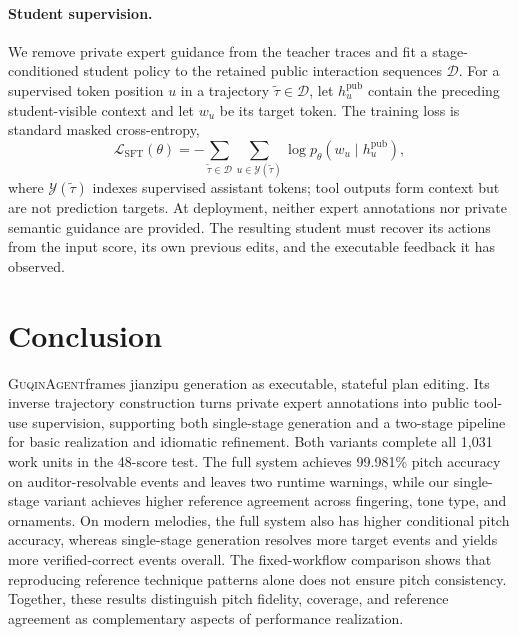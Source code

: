 \documentclass[11pt]{article}
\newcommand{\system}{\textsc{GuqinAgent}}
\begin{document}
\paragraph{Student supervision.}
We remove private expert guidance from the teacher traces and fit a stage-conditioned student policy to the retained public interaction sequences $\mathcal{D}$. For a supervised token position $u$ in a trajectory $\tilde\tau\in\mathcal{D}$, let $h_u^{\mathrm{pub}}$ contain the preceding student-visible context and let $w_u$ be its target token. The training loss is standard masked cross-entropy,
\begin{equation}
    \mathcal{L}_{\mathrm{SFT}}(\theta)
    =-\sum_{\tilde\tau\in\mathcal{D}}
      \sum_{u\in\mathcal{Y}(\tilde\tau)}
      \log p_\theta(w_u\mid h_u^{\mathrm{pub}}),
    \label{eq:sft}
\end{equation}
where $\mathcal{Y}(\tilde\tau)$ indexes supervised assistant tokens; tool outputs form context but are not prediction targets. At deployment, neither expert annotations nor private semantic guidance are provided. The resulting student must recover its actions from the input score, its own previous edits, and the executable feedback it has observed.



\section{Conclusion}
\system frames jianzipu generation as executable, stateful plan editing. Its inverse trajectory construction turns private expert annotations into public tool-use supervision, supporting both single-stage generation and a two-stage pipeline for basic realization and idiomatic refinement. Both variants complete all 1,031 work units in the 48-score test. The full system achieves 99.981\% pitch accuracy on auditor-resolvable events and leaves two runtime warnings, while our single-stage variant achieves higher reference agreement across fingering, tone type, and ornaments. On modern melodies, the full system also has higher conditional pitch accuracy, whereas single-stage generation resolves more target events and yields more verified-correct events overall. The fixed-workflow comparison shows that reproducing reference technique patterns alone does not ensure pitch consistency. Together, these results distinguish pitch fidelity, coverage, and reference agreement as complementary aspects of performance realization.
\end{document}
